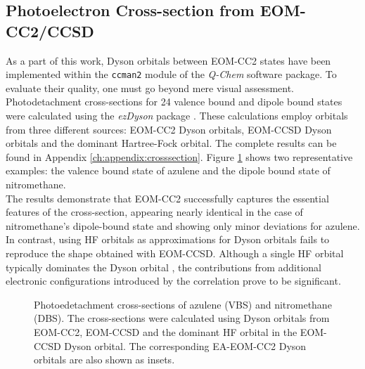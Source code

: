 
\subsection{Photoelectron Cross-section from EOM-CC2/CCSD}\label{sec:results:crosssection}

As a part of this work, Dyson orbitals between EOM-CC2 states have been implemented within the \texttt{ccman2} module of the \textit{Q-Chem} software package. To evaluate their quality, one must go beyond mere visual assessment.\\

Photodetachment cross-sections for 24 valence bound and dipole bound states were calculated using the \textit{ezDyson} package \cite{gozem2022ezspectra,gozem2015photoionization}. These calculations employ orbitals from three different sources: EOM-CC2 Dyson orbitals, EOM-CCSD Dyson orbitals and the dominant Hartree-Fock orbital. The complete results can be found in Appendix \ref{ch:appendix:crosssection}. Figure \ref{fig:ezDyson} shows two representative examples: the valence bound state of azulene and the dipole bound state of nitromethane.\\

The results demonstrate  that EOM-CC2 successfully captures the essential features of the cross-section, appearing nearly identical in the case of nitromethane's dipole-bound state and showing only minor deviations for azulene. In contrast, using HF orbitals as approximations for Dyson orbitals fails to reproduce the shape obtained with EOM-CCSD. Although a single HF orbital typically dominates the Dyson orbital \cite{diaz2019dyson}, the contributions from additional electronic configurations introduced by the correlation prove to be significant.

\begin{figure}[th!]
    \centering
    \small
    
    \caption[Photoedetachment Crossections.]{ Photoedetachment cross-sections of azulene (VBS) and nitromethane (DBS). The cross-sections were calculated using Dyson orbitals from EOM-CC2, EOM-CCSD and the dominant HF orbital in the EOM-CCSD Dyson orbital. The corresponding EA-EOM-CC2 Dyson orbitals are also shown as insets.}
    \label{fig:ezDyson}
\end{figure}

